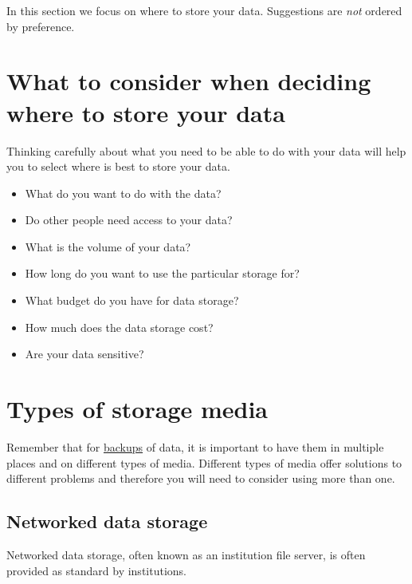 \documentclass[12pt,a4paper,oneside]{report}
\providecommand{\tightlist}{%
  \setlength{\itemsep}{0pt}\setlength{\parskip}{0pt}}
\begin{document}
In this section we focus on where to store your data. Suggestions are
\emph{not} ordered by preference.

\hypertarget{what-to-consider-when-deciding-where-to-store-your-data}{%
\section{What to consider when deciding where to store your
data}\label{what-to-consider-when-deciding-where-to-store-your-data}}

Thinking carefully about what you need to be able to do with your data
will help you to select where is best to store your data.

\begin{itemize}
\tightlist
\item
  What do you want to do with the data?
\item
  Do other people need access to your data?
\item
  What is the volume of your data?
\item
  How long do you want to use the particular storage for?
\item
  What budget do you have for data storage?
\item
  How much does the data storage cost?
\item
  Are your data sensitive?
\end{itemize}

\hypertarget{types-of-storage-media}{%
\section{Types of storage media}\label{types-of-storage-media}}

Remember that for \protect\hyperlink{data-backup}{backups} of data, it
is important to have them in multiple places and on different types of
media. Different types of media offer solutions to different problems
and therefore you will need to consider using more than one.

\hypertarget{networked-data-storage}{%
\subsection{Networked data storage}\label{networked-data-storage}}

Networked data storage, often known as an institution file server, is
often provided as standard by institutions.
\end{document}
